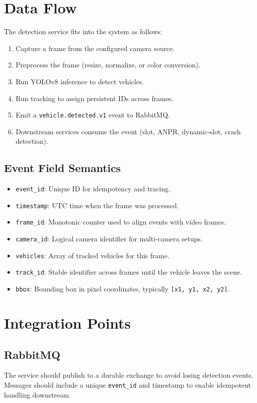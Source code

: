\documentclass[11pt]{article}
\begin{document}
\section{Data Flow}
The detection service fits into the system as follows:

\begin{enumerate}
  \item Capture a frame from the configured camera source.
  \item Preprocess the frame (resize, normalize, or color conversion).
  \item Run YOLOv8 inference to detect vehicles.
  \item Run tracking to assign persistent IDs across frames.
  \item Emit a \texttt{vehicle.detected.v1} event to RabbitMQ.
  \item Downstream services consume the event (slot, ANPR, dynamic-slot, crash detection).
\end{enumerate}

\subsection*{Event Field Semantics}
\begin{itemize}
  \item \texttt{event\_id}: Unique ID for idempotency and tracing.
  \item \texttt{timestamp}: UTC time when the frame was processed.
  \item \texttt{frame\_id}: Monotonic counter used to align events with video frames.
  \item \texttt{camera\_id}: Logical camera identifier for multi-camera setups.
  \item \texttt{vehicles}: Array of tracked vehicles for this frame.
  \item \texttt{track\_id}: Stable identifier across frames until the vehicle leaves the scene.
  \item \texttt{bbox}: Bounding box in pixel coordinates, typically \texttt{[x1, y1, x2, y2]}.
\end{itemize}

\section{Integration Points}
\subsection*{RabbitMQ}
The service should publish to a durable exchange to avoid losing detection events. Messages should include a unique \texttt{event\_id} and timestamp to enable idempotent handling downstream.
\end{document}
